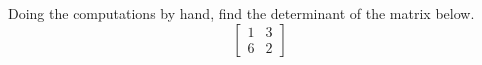 Doing the computations by hand, find the determinant of the matrix below.
%
\begin{equation*}
\begin{bmatrix}
1 & 3\\
6 & 2
\end{bmatrix}
\end{equation*}